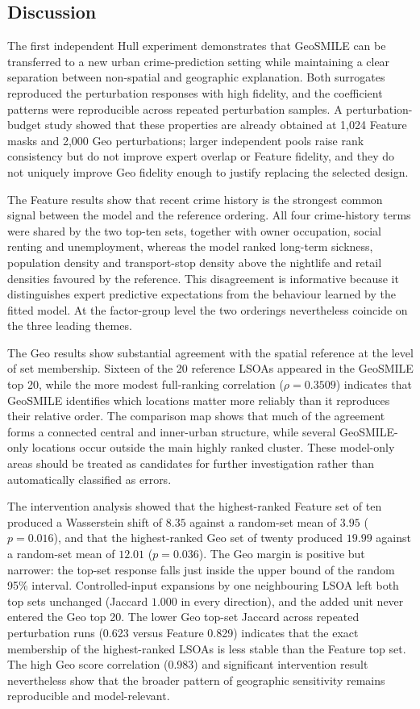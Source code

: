 \subsection{Discussion}
\label{sec:hull_discussion}

The first independent Hull experiment demonstrates that GeoSMILE can be transferred to a new urban crime-prediction setting while maintaining a clear separation between non-spatial and geographic explanation. Both surrogates reproduced the perturbation responses with high fidelity, and the coefficient patterns were reproducible across repeated perturbation samples. A perturbation-budget study showed that these properties are already obtained at 1,024 Feature masks and 2,000 Geo perturbations; larger independent pools raise rank consistency but do not improve expert overlap or Feature fidelity, and they do not uniquely improve Geo fidelity enough to justify replacing the selected design.

The Feature results show that recent crime history is the strongest common signal between the model and the reference ordering. All four crime-history terms were shared by the two top-ten sets, together with owner occupation, social renting and unemployment, whereas the model ranked long-term sickness, population density and transport-stop density above the nightlife and retail densities favoured by the reference. This disagreement is informative because it distinguishes expert predictive expectations from the behaviour learned by the fitted model. At the factor-group level the two orderings nevertheless coincide on the three leading themes.

The Geo results show substantial agreement with the spatial reference at the level of set membership. Sixteen of the 20 reference LSOAs appeared in the GeoSMILE top 20, while the more modest full-ranking correlation ($\rho=0.3509$) indicates that GeoSMILE identifies which locations matter more reliably than it reproduces their relative order. The comparison map shows that much of the agreement forms a connected central and inner-urban structure, while several GeoSMILE-only locations occur outside the main highly ranked cluster. These model-only areas should be treated as candidates for further investigation rather than automatically classified as errors.

The intervention analysis showed that the highest-ranked Feature set of ten produced a Wasserstein shift of $8.35$ against a random-set mean of $3.95$ ($p=0.016$), and that the highest-ranked Geo set of twenty produced $19.99$ against a random-set mean of $12.01$ ($p=0.036$). The Geo margin is positive but narrower: the top-set response falls just inside the upper bound of the random 95\% interval. Controlled-input expansions by one neighbouring LSOA left both top sets unchanged (Jaccard $1.000$ in every direction), and the added unit never entered the Geo top 20. The lower Geo top-set Jaccard across repeated perturbation runs (0.623 versus Feature 0.829) indicates that the exact membership of the highest-ranked LSOAs is less stable than the Feature top set. The high Geo score correlation (0.983) and significant intervention result nevertheless show that the broader pattern of geographic sensitivity remains reproducible and model-relevant.

